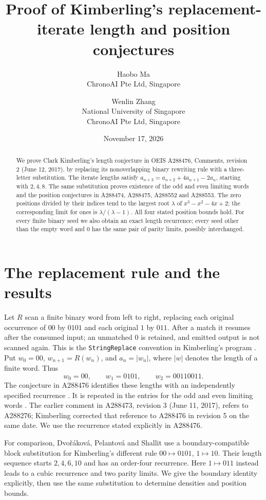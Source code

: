 \documentclass[11pt]{article}
\title{Proof of Kimberling's replacement-iterate length and position conjectures}
\author{Haobo Ma\\\small ChronoAI Pte Ltd, Singapore
\and Wenlin Zhang\\\small National University of Singapore\\\small ChronoAI Pte Ltd, Singapore}
\date{November 17, 2026}
\begin{document}
\maketitle
\begin{abstract}
We prove Clark Kimberling's length conjecture in OEIS A288476, Comments,
revision 2 (June 12, 2017), by replacing its
nonoverlapping binary rewriting rule with a three-letter substitution.
The iterate lengths satisfy $a_{n+3}=a_{n+2}+4a_{n+1}-2a_n$, starting
with $2,4,8$. The same substitution proves existence of the odd and even
limiting words and the position conjectures in A288474, A288475,
A288552 and A288553. The zero positions divided by their indices tend
to the largest root $\lambda$ of $x^3-x^2-4x+2$; the corresponding
limit for ones is $\lambda/(\lambda-1)$. All four stated position bounds hold.
For every finite binary seed we also obtain an exact length recurrence;
every seed other than the empty word and $0$ has the same pair of parity
limits, possibly interchanged.
\end{abstract}

\section{The replacement rule and the results}
Let $R$ scan a finite binary word from left to right, replacing each
original occurrence of $00$ by $0101$ and each original $1$ by $011$.
After a match it resumes after the consumed input; an unmatched $0$
is retained, and emitted output is not scanned again. This is the
\texttt{StringReplace} convention in Kimberling's program
\cite{a288473,wolfram}. Put $w_0=00$, $w_{n+1}=R(w_n)$, and
$a_n=|w_n|$, where $|w|$ denotes the length of a finite word.
Thus
\[
w_0=00,\qquad w_1=0101,\qquad w_2=00110011.
\]
The conjecture in A288476 identifies these lengths with an independently
specified recurrence \cite{a288476}. It is repeated in the entries for
the odd and even limiting words \cite{a288473,a288551}.
The earlier comment in A288473, revision 3 (June 11, 2017), refers
to A288276; Kimberling corrected that reference to A288476 in revision 5
on the same date. We use the recurrence stated explicitly in A288476.

For comparison, Dvo\v{r}\'akov\'a, Pelantov\'a and Shallit
\cite[Section 2]{dps} use a boundary-compatible block substitution for
Kimberling's different rule $00\mapsto0101$, $1\mapsto10$.
Their length sequence starts $2,4,6,10$ and has an order-four recurrence.
Here $1\mapsto011$ instead leads to a cubic recurrence and two parity
limits. We give the boundary identity explicitly, then use the same
substitution to determine densities and position bounds.
\end{document}
